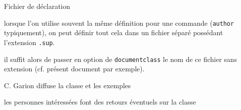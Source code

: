 \documentclass[fr,cr]{supaero-mins}
\begin{document}
\begin{crlist}{Fichier de déclaration}
\item lorsque l'on utilise souvent la même définition pour une
  commande (\verb!author! typiquement), on peut définir tout cela dans
  un fichier séparé possédant l'extension \verb!.sup!.
\item il suffit alors de passer en option de \verb!documentclass! le
  nom de ce fichier sans extension (cf. présent document par exemple).
\end{crlist}







\begin{actions}
\item C. Garion diffuse la classe et les exemples
\item les personnes intéressées font des retours éventuels sur la
  classe
\end{actions}
\end{document}
